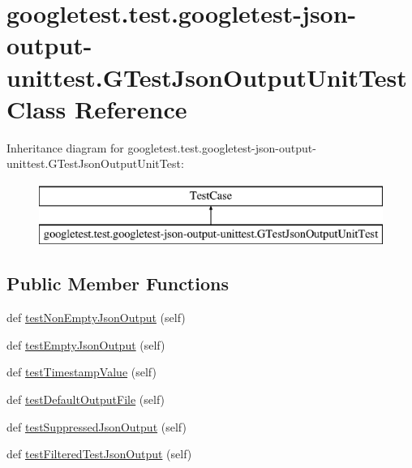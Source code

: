 \hypertarget{classgoogletest_1_1test_1_1googletest-json-output-unittest_1_1_g_test_json_output_unit_test}{}\section{googletest.\+test.\+googletest-\/json-\/output-\/unittest.G\+Test\+Json\+Output\+Unit\+Test Class Reference}
\label{classgoogletest_1_1test_1_1googletest-json-output-unittest_1_1_g_test_json_output_unit_test}
Inheritance diagram for googletest.\+test.\+googletest-\/json-\/output-\/unittest.G\+Test\+Json\+Output\+Unit\+Test\+:\begin{figure}[H]
\begin{center}
\leavevmode
\includegraphics[height=2.000000cm]{df/da5/classgoogletest_1_1test_1_1googletest-json-output-unittest_1_1_g_test_json_output_unit_test}
\end{center}
\end{figure}
\subsection*{Public Member Functions}
\begin{DoxyCompactItemize}
\item 
def \mbox{\hyperlink{classgoogletest_1_1test_1_1googletest-json-output-unittest_1_1_g_test_json_output_unit_test_aaee017171107067c1165a3588bccc849}{test\+Non\+Empty\+Json\+Output}} (self)
\item 
def \mbox{\hyperlink{classgoogletest_1_1test_1_1googletest-json-output-unittest_1_1_g_test_json_output_unit_test_a3cb0c9384b8b8dbe731ecf77854859f8}{test\+Empty\+Json\+Output}} (self)
\item 
def \mbox{\hyperlink{classgoogletest_1_1test_1_1googletest-json-output-unittest_1_1_g_test_json_output_unit_test_ae805a681187e27b47feaf05e2d236143}{test\+Timestamp\+Value}} (self)
\item 
def \mbox{\hyperlink{classgoogletest_1_1test_1_1googletest-json-output-unittest_1_1_g_test_json_output_unit_test_a93504e8c8880e4b7e16c9994ff9c3c78}{test\+Default\+Output\+File}} (self)
\item 
def \mbox{\hyperlink{classgoogletest_1_1test_1_1googletest-json-output-unittest_1_1_g_test_json_output_unit_test_af4abeac68681243637466779ee58846a}{test\+Suppressed\+Json\+Output}} (self)
\item 
def \mbox{\hyperlink{classgoogletest_1_1test_1_1googletest-json-output-unittest_1_1_g_test_json_output_unit_test_a14a3795032c0c3f0bdd721e15122d91c}{test\+Filtered\+Test\+Json\+Output}} (self)
\end{DoxyCompactItemize}
